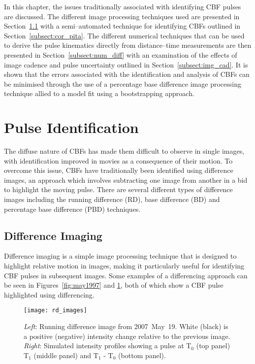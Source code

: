 In this chapter, the issues traditionally associated with identifying CBF pulses are discussed. The different image processing techniques used are presented in Section~\ref{subsect:diff_imgs} with a semi--automated technique for identifying CBFs outlined in Section~\ref{subsect:cor_pita}. The different numerical techniques that can be used to derive the pulse kinematics directly from distance--time measurements are then presented in Section~\ref{subsect:num_diff} with an examination of the effects of image cadence and pulse uncertainty outlined in Section~\ref{subsect:img_cad}. It is shown that the errors associated with the identification and analysis of CBFs can be minimised through the use of a percentage base difference image processing technique allied to a model fit using a bootstrapping approach.


\section{Pulse Identification}
\label{sect:identify_pulse}

The diffuse nature of CBFs has made them difficult to observe in single images, with identification improved in movies as a consequence of their motion. To overcome this issue, CBFs have traditionally been identified using difference images, an approach which involves subtracting one image from another in a bid to highlight the moving pulse. There are several different types of difference images including the running difference (RD), base difference (BD) and percentage base difference (PBD) techniques.


\subsection{Difference Imaging}
\label{subsect:diff_imgs}

Difference imaging is a simple image processing technique that is designed to highlight relative motion in images, making it particularly useful for identifying CBF pulses in subsequent images. Some examples of a differencing approach can be seen in Figures~\ref{fig:may1997} and \ref{fig:rd_images}, both of which show a CBF pulse highlighted using differencing.

\begin{figure}[!t]
\begin{center}
\texttt{[image: rd\_images]}
\caption{\emph{Left}: Running difference image from 2007~May~19. White (black) is a positive (negative) intensity change relative to the previous image. \emph{Right}: Simulated intensity profiles showing a pulse at T$_{0}$ (top panel) T$_{1}$ (middle panel) and T$_{1}$ - T$_{0}$ (bottom panel).}
\label{fig:rd_images}
\end{center}
\end{figure}


